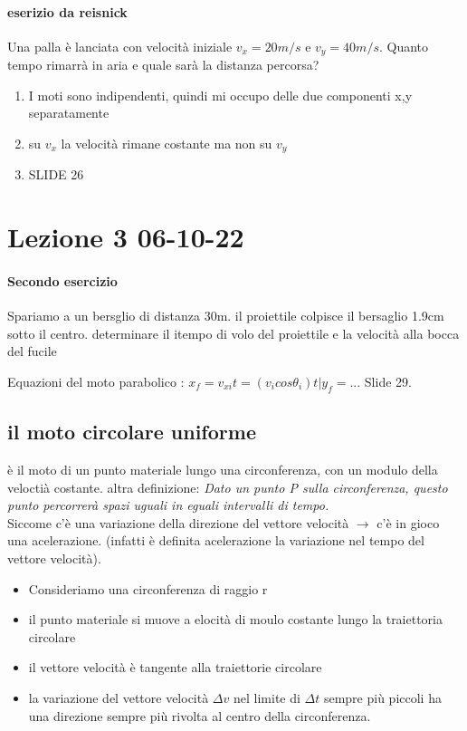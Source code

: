 \documentclass[12pt, a4paper, openany]{book}
\begin{document}
\paragraph*{eserizio da reisnick}
Una palla è lanciata con velocità iniziale $v_x = 20 m/s$ e $v_y=40m/s$. Quanto tempo rimarrà in aria e quale sarà la distanza percorsa?
\begin{enumerate}
    \item I moti sono indipendenti, quindi mi occupo delle due componenti x,y separatamente
    \item su $v_x$ la velocità rimane costante ma non su $v_y$
    \item SLIDE 26
\end{enumerate}

\section*{Lezione 3 06-10-22}
\paragraph*{Secondo esercizio} Spariamo a un bersglio di distanza 30m. il proiettile colpisce il bersaglio 1.9cm sotto il centro. determinare il itempo di volo del proiettile e la velocità alla bocca del fucile

Equazioni del moto parabolico : $x_f = v_{xi}t = (v_i cos \theta_i) t | y_f = ...$ Slide 29.

\subsection{il moto circolare uniforme} è il moto di un punto materiale lungo una circonferenza, con un modulo della veloctià costante.
altra definizione: \emph{Dato un punto P sulla circonferenza, questo punto percorrerà spazi uguali in eguali intervalli di tempo.}
\\Siccome c'è una variazione della direzione del vettore velocità $\to$ c'è in gioco una acelerazione. (infatti è definita acelerazione la variazione nel tempo del vettore velocità).
\begin{itemize}
    \item Consideriamo una circonferenza di raggio r
    \item il punto materiale si muove a elocità di moulo costante lungo la traiettoria circolare
    \item il vettore velocità è tangente alla traiettorie circolare
    \item la variazione del vettore velocità $\Delta v$ nel limite di $\Delta t$ sempre più piccoli ha una direzione sempre più rivolta al centro della circonferenza.
\end{itemize}
\end{document}
